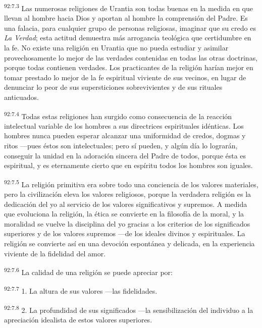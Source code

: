 \par
\textsuperscript{92:7.3} Las numerosas religiones de Urantia son todas buenas en la medida en que llevan al hombre hacia Dios y aportan al hombre la comprensión del Padre. Es una falacia, para cualquier grupo de personas religiosas, imaginar que su credo es \textit{La Verdad}; esta actitud demuestra más arrogancia teológica que certidumbre en la fe. No existe una religión en Urantia que no pueda estudiar y asimilar provechosamente lo mejor de las verdades contenidas en todas las otras doctrinas, porque todas contienen verdades. Los practicantes de la religión harían mejor en tomar prestado lo mejor de la fe espiritual viviente de sus vecinos, en lugar de denunciar lo peor de sus supersticiones sobrevivientes y de sus rituales anticuados.

\par
\textsuperscript{92:7.4} Todas estas religiones han surgido como consecuencia de la reacción intelectual variable de los hombres a sus directrices espirituales idénticas. Los hombres nunca pueden esperar alcanzar una uniformidad de credos, dogmas y ritos ---pues éstos son intelectuales; pero sí pueden, y algún día lo lograrán, conseguir la unidad en la adoración sincera del Padre de todos, porque ésta es espiritual, y es eternamente cierto que en espíritu todos los hombres son iguales.

\par
\textsuperscript{92:7.5} La religión primitiva era sobre todo una conciencia de los valores materiales, pero la civilización eleva los valores religiosos, porque la verdadera religión es la dedicación del yo al servicio de los valores significativos y supremos. A medida que evoluciona la religión, la ética se convierte en la filosofía de la moral, y la moralidad se vuelve la disciplina del yo gracias a los criterios de los significados superiores y de los valores supremos ---de los ideales divinos y espirituales. La religión se convierte así en una devoción espontánea y delicada, en la experiencia viviente de la fidelidad del amor.

\par
\textsuperscript{92:7.6} La calidad de una religión se puede apreciar por:

\par
\textsuperscript{92:7.7} 1. La altura de sus valores ---las fidelidades.

\par
\textsuperscript{92:7.8} 2. La profundidad de sus significados ---la sensibilización del individuo a la apreciación idealista de estos valores superiores.

